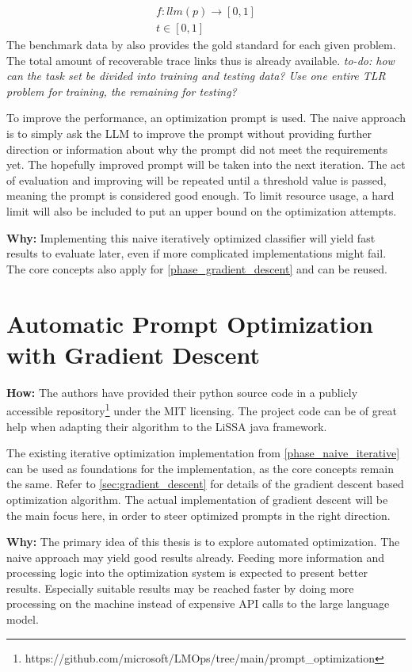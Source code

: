 \begin{align*} 
f: llm(p) \rightarrow [0, 1] \\
t \in [0, 1]
\end{align*}
The benchmark data by  also provides the gold standard for each given problem. The total amount of recoverable trace links thus is already available. \textit{to-do: how can the task set be divided into training and testing data? Use one entire TLR problem for training, the remaining for testing?}

To improve the performance, an optimization prompt is used. The naive approach is to simply ask the LLM to improve the prompt without providing further direction or information about why the prompt did not meet the requirements yet. The hopefully improved prompt will be taken into the next iteration. The act of evaluation and improving will be repeated until a threshold value is passed, meaning the prompt is considered good enough. To limit resource usage, a hard limit will also be included to put an upper bound on the optimization attempts.


\textbf{Why:} Implementing this naive iteratively optimized classifier will yield fast results to evaluate later, even if more complicated implementations might fail. The core concepts also apply for \ref{phase_gradient_descent} and can be reused. 


\section{Automatic Prompt Optimization with Gradient Descent}
\textbf{How:} The authors have provided their python source code in a publicly accessible repository\footnote{https://github.com/microsoft/LMOps/tree/main/prompt\_optimization} under the MIT licensing. The project code can be of great help when adapting their algorithm to the LiSSA java framework.

The existing iterative optimization implementation from \ref{phase_naive_iterative} can be used as foundations for the implementation, as the core concepts remain the same. Refer to \ref{sec:gradient_descent} for details of the gradient descent based optimization algorithm. The actual implementation of gradient descent will be the main focus here, in order to steer optimized prompts in the right direction.


\textbf{Why:} The primary idea of this thesis is to explore automated optimization. The naive approach may yield good results already. Feeding more information and processing logic into the optimization system is expected to present better results. Especially suitable results may be reached faster by doing more processing on the machine instead of expensive API calls to the large language model.

